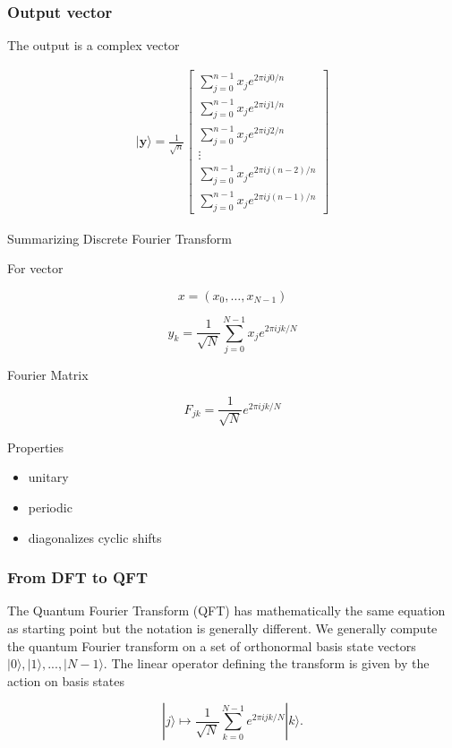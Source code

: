 \documentclass{beamer}
\begin{document}
\begin{frame}
\frametitle{Output vector}

The output is a complex vector

\begin{align*}
\vert \bm{y}\rangle = 
\frac{1}{\sqrt{n}}
\begin{bmatrix}
\sum_{j=0}^{n-1} x_je^{2\pi ij0/n} \\
\sum_{j=0}^{n-1} x_je^{2\pi ij1/n} \\
\sum_{j=0}^{n-1} x_je^{2\pi ij2/n} \\
\vdots \\
\sum_{j=0}^{n-1} x_je^{2\pi ij(n-2)/n} \\
\sum_{j=0}^{n-1} x_je^{2\pi ij(n-1)/n}
\end{bmatrix}
\end{align*}
\end{frame}

\begin{frame}{Summarizing Discrete Fourier Transform}

For vector

\[
x=(x_0,\dots,x_{N-1})
\]

\[
y_k =
\frac{1}{\sqrt N}
\sum_{j=0}^{N-1}
x_j e^{2\pi i jk/N}
\]

\end{frame}


\begin{frame}{Fourier Matrix}

\[
F_{jk}=
\frac{1}{\sqrt N}
e^{2\pi i jk/N}
\]

Properties

\begin{itemize}
\item unitary
\item periodic
\item diagonalizes cyclic shifts
\end{itemize}

\end{frame}



\begin{frame}
\frametitle{From DFT to QFT}

The Quantum Fourier Transform (QFT) has mathematically the same equation as starting point
but the notation is generally different. We generally compute the
quantum Fourier transform on a set of orthonormal basis state vectors
\(|0\rangle, |1\rangle, ..., |N-1\rangle\). The linear operator defining
the transform is given by the action on basis states

\[
|j\rangle \mapsto \frac{1}{\sqrt{N}} \sum_{k=0}^{N-1} e^{2\pi ijk/N}|k\rangle.
\]
\end{frame}
\end{document}
